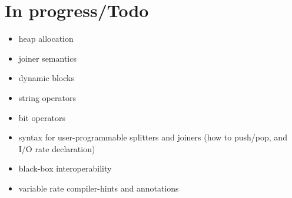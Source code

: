 \documentclass{tr}
\begin{document}
\section{In progress/Todo}
\begin{itemize}
\item heap allocation
\item joiner semantics
\item dynamic blocks
\item string operators
\item bit operators
\item syntax for user-programmable splitters and joiners (how to
push/pop, and I/O rate declaration)
\item black-box interoperability
\item variable rate compiler-hints and annotations
\end{itemize}
\end{document}
